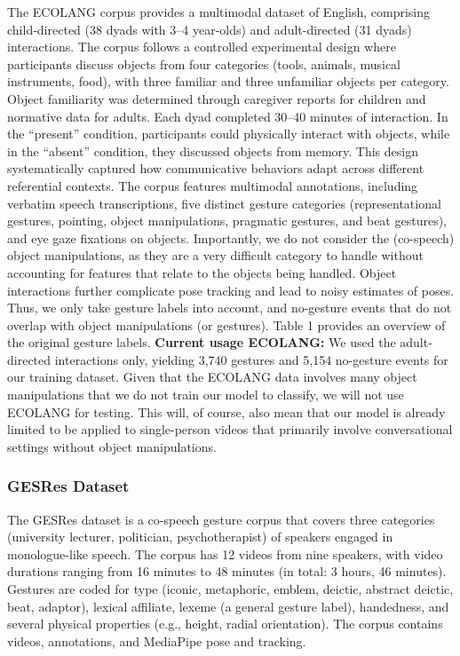 \documentclass[11pt,smallheadings,cleardoublepage=empty,tocflat,numbers=noenddot,twoside,captions=tableheading]{scrbook}
\begin{document}
\begin{refsection}
The ECOLANG corpus provides a multimodal dataset of English, comprising child-directed (38 dyads with 3–4 year-olds) and adult-directed (31 dyads) interactions. The corpus follows a controlled experimental design where participants discuss objects from four categories (tools, animals, musical instruments, food), with three familiar and three unfamiliar objects per category. Object familiarity was determined through caregiver reports for children and normative data for adults. Each dyad completed 30–40 minutes of interaction. In the ``present'' condition, participants could physically interact with objects, while in the ``absent'' condition, they discussed objects from memory. This design systematically captured how communicative behaviors adapt across different referential contexts. The corpus features multimodal annotations, including verbatim speech transcriptions, five distinct gesture categories (representational gestures, pointing, object manipulations, pragmatic gestures, and beat gestures), and eye gaze fixations on objects. Importantly, we do not consider the (co-speech) object manipulations, as they are a very difficult category to handle without accounting for features that relate to the objects being handled. Object interactions further complicate pose tracking and lead to noisy estimates of poses. Thus, we only take gesture labels into account, and no-gesture events that do not overlap with object manipulations (or gestures). Table 1 provides an overview of the original gesture labels.
\textbf{Current usage ECOLANG:} We used the adult-directed interactions only, yielding 3,740 gestures and 5,154 no-gesture events for our training dataset. Given that the ECOLANG data involves many object manipulations that we do not train our model to classify, we will not use ECOLANG for testing. This will, of course, also mean that our model is already limited to be applied to single-person videos that primarily involve conversational settings without object manipulations.

\subsubsection{GESRes Dataset}
The GESRes dataset \parencite{hensel2025richly} is a co-speech gesture corpus that covers three categories (university lecturer, politician, psychotherapist) of speakers engaged in monologue-like speech. The corpus has 12 videos from nine speakers, with video durations ranging from 16 minutes to 48 minutes (in total: 3 hours, 46 minutes). Gestures are coded for type (iconic, metaphoric, emblem, deictic, abstract deictic, beat, adaptor), lexical affiliate, lexeme (a general gesture label), handedness, and several physical properties (e.g., height, radial orientation). The corpus contains videos, annotations, and MediaPipe pose and tracking. 


\end{refsection}
\end{document}
